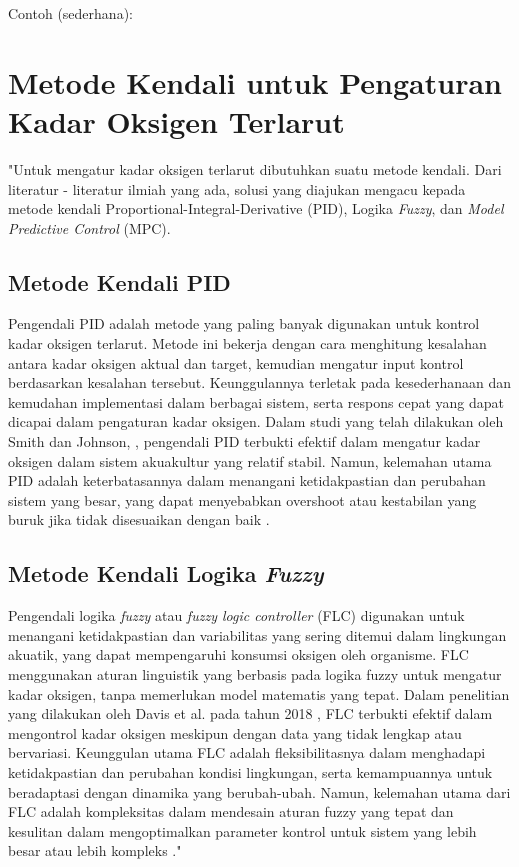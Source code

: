 \noindent
Contoh (sederhana):

\section{Metode Kendali untuk Pengaturan Kadar Oksigen Terlarut}
"Untuk mengatur kadar oksigen terlarut dibutuhkan suatu metode kendali. Dari literatur - literatur ilmiah yang ada, solusi yang diajukan mengacu kepada metode kendali Proportional-Integral-Derivative (PID), Logika \textit{Fuzzy}, dan \textit{Model Predictive Control} (MPC).

    \subsection{Metode Kendali PID}
    \label{subsec:Metode_Kendali_PID}
    Pengendali PID adalah metode yang paling banyak digunakan untuk kontrol kadar oksigen terlarut. Metode ini bekerja dengan cara menghitung kesalahan antara kadar oksigen aktual dan target, kemudian mengatur input kontrol berdasarkan kesalahan tersebut. Keunggulannya terletak pada kesederhanaan dan kemudahan implementasi dalam berbagai sistem, serta respons cepat yang dapat dicapai dalam pengaturan kadar oksigen. Dalam studi yang telah dilakukan oleh Smith dan Johnson, \cite{smith_pid_2017}, pengendali PID terbukti efektif dalam mengatur kadar oksigen dalam sistem akuakultur yang relatif stabil. Namun, kelemahan utama PID adalah keterbatasannya dalam menangani ketidakpastian dan perubahan sistem yang besar, yang dapat menyebabkan overshoot atau kestabilan yang buruk jika tidak disesuaikan dengan baik \cite{nguyen_pid_2019}.
    
    \subsection{Metode Kendali Logika \textit{Fuzzy}}
    \label{subsec:Metode_Kendali_Logika_Fuzzy}

    Pengendali logika \textit{fuzzy} atau \textit{fuzzy logic controller} (FLC) digunakan untuk menangani ketidakpastian dan variabilitas yang sering ditemui dalam lingkungan akuatik, yang dapat mempengaruhi konsumsi oksigen oleh organisme. FLC menggunakan aturan linguistik yang berbasis pada logika fuzzy untuk mengatur kadar oksigen, tanpa memerlukan model matematis yang tepat. Dalam penelitian yang dilakukan oleh Davis et al. pada tahun 2018 \cite{davis_flc_2019}, FLC terbukti efektif dalam mengontrol kadar oksigen meskipun dengan data yang tidak lengkap atau bervariasi. Keunggulan utama FLC adalah fleksibilitasnya dalam menghadapi ketidakpastian dan perubahan kondisi lingkungan, serta kemampuannya untuk beradaptasi dengan dinamika yang berubah-ubah. Namun, kelemahan utama dari FLC adalah kompleksitas dalam mendesain aturan fuzzy yang tepat dan kesulitan dalam mengoptimalkan parameter kontrol untuk sistem yang lebih besar atau lebih kompleks \cite{li_OptFLC_2020}."
    
